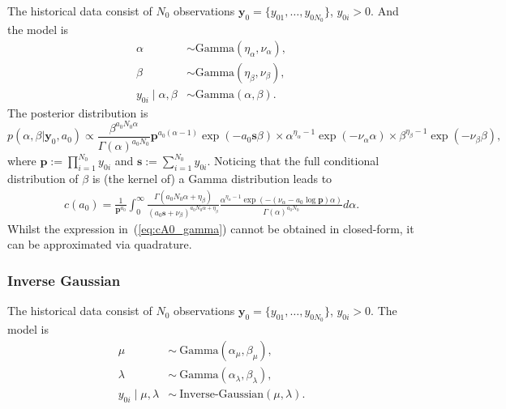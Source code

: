 \documentclass[a4paper, notitlepage, 11pt]{article}
\begin{document}
The historical data consist of $N_0$ observations $\boldsymbol y_0 =\{y_{01}, \ldots , y_{0N_0}\}$, $y_{0i} > 0$.
And the model is
\begin{align*}
 \alpha &\sim \text{Gamma}(\eta_\alpha, \nu_\alpha), \\
 \beta &\sim \text{Gamma}(\eta_\beta, \nu_\beta), \\
 y_{0i} \mid \alpha, \beta &\sim \text{Gamma}(\alpha, \beta).
\end{align*}
The posterior distribution is 
\begin{equation}
 \label{eq:posterior_gamma}
 p(\alpha, \beta | \boldsymbol y_{0}, a_0) \propto \frac{\beta^{a_0N_0\alpha}}{\Gamma(\alpha)^{a_0N_0}} \boldsymbol p^{a_0(\alpha-1)} \exp(-a_0\boldsymbol s\beta) \times  \alpha^{\eta_\alpha -1} \exp(-\nu_\alpha \alpha) \times \beta^{\eta_\beta -1} \exp(-\nu_\beta \beta),
\end{equation}
where $\boldsymbol p := \prod_{i =1}^{N_0} y_{0i}$ and $\boldsymbol s := \sum_{i =1}^{N_0} y_{0i}$.
Noticing that the full conditional distribution of $\beta$ is (the kernel of) a Gamma distribution leads to
\begin{align}
 \label{eq:cA0_gamma}
 c(a_0) = \frac{1}{\boldsymbol p^{a_0} }\int_0^\infty \frac{\Gamma(a_0N_0\alpha + \eta_\beta)}{\left( a_0\boldsymbol s + \nu_\beta \right)^{a_0N_0\alpha + \eta_\beta}} \frac{\alpha^{\eta_\alpha -1} \exp(- ( \nu_\alpha - a_0 \log \boldsymbol p) \alpha)}{\Gamma(\alpha)^{a_0 N_0}} d\alpha.
\end{align}
Whilst the expression in~(\ref{eq:cA0_gamma}) cannot be obtained in closed-form, it can be approximated via quadrature.


\subsubsection*{Inverse Gaussian}

The historical data consist of $N_0$ observations $\boldsymbol y_0 =\{y_{01}, \ldots , y_{0N_0}\}$, $y_{0i} > 0$.
The model is
\begin{align*}
 \mu & \sim~\text{Gamma}(\alpha_\mu, \beta_\mu),\\
 \lambda & \sim~\text{Gamma}(\alpha_\lambda, \beta_\lambda),\\
 y_{0i} \mid \mu, \lambda &\sim~\text{Inverse-Gaussian}(\mu, \lambda).
\end{align*}
\end{document}
